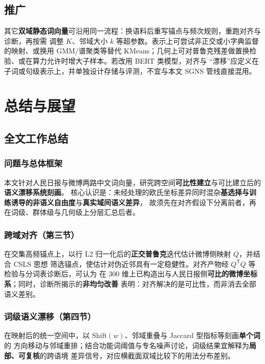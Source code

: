 \documentclass[withoutpreface]{cumcmthesis}
\begin{document}
\subsection{推广}

其它\textbf{双域静态词向量}可沿用同一流程：换语料后重写锚点与频次规则，重跑对齐与诊断，再按需
调整 $K$、邻域大小 $k$ 等超参数。表示上可尝试非正交或小字典监督的映射、或换用 GMM/谱聚类等替代
KMeans；几何上可对普鲁克残差做置换检验、或在算力允许时增大子样本。若改用 BERT 类模型，对齐与
“漂移”应定义在子词或句级表示上，并单独设计存储与评测，不宜与本文 SGNS 管线直接混用。

\FloatBarrier
\section{总结与展望}

\subsection{全文工作总结}

\subsubsection{问题与总体框架}
本文针对人民日报与微博两路中文词向量，研究跨空间\textbf{可比性建立}与可比建立后的\textbf{语义漂移系统刻画}。
核心认识是：未经处理的欧氏坐标差异同时混杂\textbf{基选择与训练诱导的非语义自由度}与\textbf{真实域间语义差异}，
故须先在对齐假设下分离前者，再在词级、群体级与几何级上分层汇总后者。

\subsubsection{跨域对齐（第三节）}
在交集高频锚点上，以行 L2 归一化后的\textbf{正交普鲁克}迭代估计微博侧映射 $Q$，并结合 CSLS 思想
筛选锚点，使估计对伪近邻具有一定稳健性。对齐产物经 $Q^{\mathsf{T}}Q$ 等检验与分词表诊断后，可认为
在 $300$ 维上已构造出与人民日报侧\textbf{可比的微博坐标系}；同时，诊断所揭示的\textbf{非均匀改善}
表明：对齐解决的是可比性，而非消去全部语义差别。

\subsubsection{词级语义漂移（第四节）}
在映射后的统一空间中，以 $\mathrm{Shift}(w)$、邻域重叠与 Jaccard 型指标等刻画\textbf{单个词}的
方向移动与邻域重排；结合功能词阈值与专名噪声讨论，词级结果宜解释为\textbf{局部、可复核}的跨语境
差异信号，对应横截面双域比较下的用法分布差别。
\end{document}
